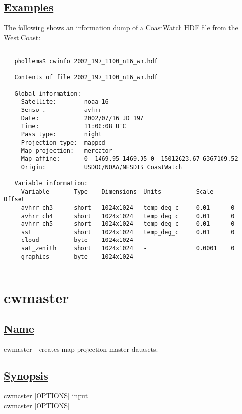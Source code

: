 \subsection*{\underline{Examples}}


  The following shows an information dump of a CoastWatch HDF file from the West Coast:
\begin{verbatim}

   phollema$ cwinfo 2002_197_1100_n16_wn.hdf

   Contents of file 2002_197_1100_n16_wn.hdf
   
   Global information:
     Satellite:        noaa-16
     Sensor:           avhrr
     Date:             2002/07/16 JD 197
     Time:             11:00:08 UTC
     Pass type:        night
     Projection type:  mapped
     Map projection:   mercator
     Map affine:       0 -1469.95 1469.95 0 -15012623.67 6367109.52 
     Origin:           USDOC/NOAA/NESDIS CoastWatch
   
   Variable information:
     Variable       Type    Dimensions  Units          Scale     Offset    
     avhrr_ch3      short   1024x1024   temp_deg_c     0.01      0         
     avhrr_ch4      short   1024x1024   temp_deg_c     0.01      0         
     avhrr_ch5      short   1024x1024   temp_deg_c     0.01      0         
     sst            short   1024x1024   temp_deg_c     0.01      0         
     cloud          byte    1024x1024   -              -         -         
     sat_zenith     short   1024x1024   -              0.0001    0         
     graphics       byte    1024x1024   -              -         -         
 
\end{verbatim}

\newpage
\section{cwmaster} \hypertarget{cwmaster}{}
\subsection*{\underline{Name}}


   cwmaster - creates map projection master datasets.  
\subsection*{\underline{Synopsis}}


  cwmaster [OPTIONS] input \\ 
 cwmaster [OPTIONS] 
